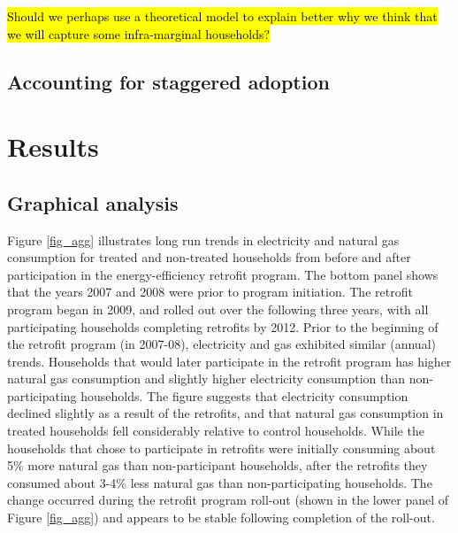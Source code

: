 \documentclass{article}
\newcommand{\hlc}[2][yellow]{ {\sethlcolor{#1} \hl{#2}} }
\begin{document}
\hlc{Should we perhaps use a theoretical model to explain better why we think that we will capture some infra-marginal households?}

\subsection{Accounting for staggered adoption}
 

\section{Results}

\subsection{Graphical analysis}
Figure \ref{fig_agg} illustrates long run trends in electricity and natural gas consumption for treated and non-treated households from before and after participation in the energy-efficiency retrofit program. The bottom panel shows that the years 2007 and 2008 were prior to program initiation. The retrofit program began in 2009, and rolled out over the following three years, with all participating households completing retrofits by 2012. Prior to the beginning of the retrofit program (in 2007-08), electricity and gas exhibited similar (annual) trends. Households that would later participate in the retrofit program has higher natural gas consumption and slightly higher electricity consumption than non-participating households. The figure suggests that electricity consumption declined slightly as a result of the retrofits, and that natural gas consumption in treated households fell considerably relative to control households. While the households that chose to participate in retrofits were initially consuming about 5\% more natural gas than non-participant households, after the retrofits they consumed about 3-4\% less natural gas than non-participating households. The change occurred during the retrofit program roll-out (shown in the lower panel of Figure \ref{fig_agg}) and appears to be stable following completion of the roll-out.
\end{document}
